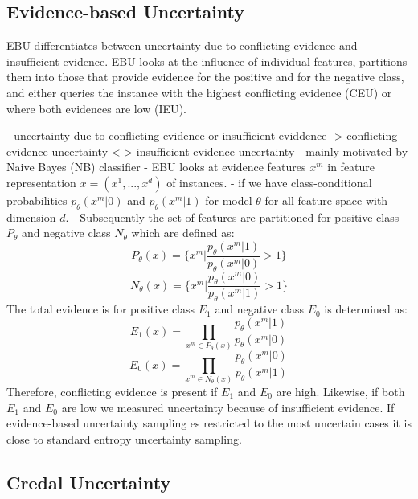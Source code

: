 \subsection{Evidence-based Uncertainty} 

\ac{EBU} differentiates between uncertainty due to conflicting evidence and insufficient evidence.
\ac{EBU} looks at the influence of individual features,
partitions them into those that provide evidence for the positive and for the negative class, 
and either queries the instance with the highest conflicting evidence (\ac{CEU}) or where both evidences are low (\ac{IEU}).

- uncertainty due to conflicting evidence or insufficient eviddence
-> conflicting-evidence uncertainty <-> insufficient evidence uncertainty
- mainly motivated by Naive Bayes (NB) classifier
- EBU looks at evidence features $x^m$ in feature representation $x = (x^1, ..., x^d)$ of instances. 
- if we have class-conditional probabilities $p_{\theta}(x^m|0)$ and $p_{\theta}(x^m|1)$ for model $\theta$ for all feature space with dimension $d$.
- Subsequently the set of features are partitioned for positive class $P_{\theta}$ and negative class $N_{\theta}$ which are defined as:
\begin{equation}
    P_{\theta}(x) = \bigg\{ x^m \bigg| \frac{p_{\theta}(x^m|1)}{p_{\theta}(x^m|0)} > 1 \bigg\} 
\end{equation}
 \begin{equation}
    N_{\theta}(x) = \bigg\{ x^m \bigg| \frac{p_{\theta}(x^m|0)}{p_{\theta}(x^m|1)} > 1 \bigg\} 
\end{equation}
The total evidence is for positive class $E_1$ and negative class $E_0$ is determined as:
\begin{equation}
    E_1(x) = \prod\limits_{x^m \in P_{\theta}(x)} \frac{p_{\theta}(x^m|1)}{p_{\theta}(x^m|0)}
\end{equation}
\begin{equation}
    E_0(x) = \prod\limits_{x^m \in N_{\theta}(x)} \frac{p_{\theta}(x^m|0)}{p_{\theta}(x^m|1)}
\end{equation} 
Therefore, conflicting evidence is present if $E_1$ and $E_0$ are high.
Likewise, if both $E_1$ and $E_0$ are low we measured uncertainty because of insufficient evidence.
If evidence-based uncertainty sampling es restricted to the most uncertain cases it is close to standard entropy uncertainty sampling.




\subsection{Credal Uncertainty}    

